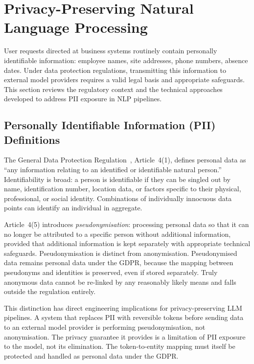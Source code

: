 \section{Privacy-Preserving Natural Language Processing}
\label{sec:background_privacy_nlp}

User requests directed at business systems routinely contain personally identifiable information: employee names, site addresses, phone numbers, absence dates. Under data protection regulations, transmitting this information to external model providers requires a valid legal basis and appropriate safeguards. This section reviews the regulatory context and the technical approaches developed to address PII exposure in NLP pipelines.

\subsection{Personally Identifiable Information (PII) Definitions}
\label{subsec:background_pii_definitions}

The General Data Protection Regulation~\cite{gdpr2016}, Article~4(1), defines personal data as ``any information relating to an identified or identifiable natural person.'' Identifiability is broad: a person is identifiable if they can be singled out by name, identification number, location data, or factors specific to their physical, professional, or social identity. Combinations of individually innocuous data points can identify an individual in aggregate.

Article~4(5) introduces \emph{pseudonymisation}: processing personal data so that it can no longer be attributed to a specific person without additional information, provided that additional information is kept separately with appropriate technical safeguards. Pseudonymisation is distinct from anonymisation. Pseudonymised data remains personal data under the GDPR, because the mapping between pseudonyms and identities is preserved, even if stored separately. Truly anonymous data cannot be re-linked by any reasonably likely means and falls outside the regulation entirely.

This distinction has direct engineering implications for privacy-preserving LLM pipelines. A system that replaces PII with reversible tokens before sending data to an external model provider is performing pseudonymisation, not anonymisation. The privacy guarantee it provides is a limitation of PII exposure to the model, not its elimination. The token-to-entity mapping must itself be protected and handled as personal data under the GDPR.

